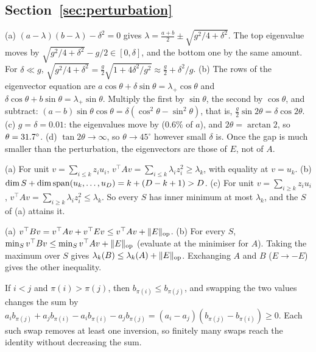 \subsection*{Section~\ref{sec:perturbation}}

(a) $(a-\lambda)(b-\lambda)-\delta^2=0$ gives $\lambda=\frac{a+b}2\pm\sqrt{g^2/4+\delta^2}$. The top eigenvalue moves
by $\sqrt{g^2/4+\delta^2}-g/2\in[0,\delta]$, and the bottom one by the same amount. For $\delta\ll g$,
$\sqrt{g^2/4+\delta^2}=\frac g2\sqrt{1+4\delta^2/g^2}\approx\frac g2+\delta^2/g$.
\newline (b) The rows of the eigenvector equation are $a\cos\theta+\delta\sin\theta=\lambda_+\cos\theta$ and
$\delta\cos\theta+b\sin\theta=\lambda_+\sin\theta$. Multiply the first by $\sin\theta$, the second by $\cos\theta$, and
subtract: $(a-b)\sin\theta\cos\theta=\delta(\cos^2\theta-\sin^2\theta)$, that is, $\frac g2\sin2\theta=\delta\cos2\theta$.
\newline (c) $g=\delta=0.01$: the eigenvalues move by \NumTwoShift{} (0.6\% of $a$), and $2\theta=\arctan2$, so
$\theta=31.7^\circ$.
\newline (d) $\tan2\theta\to\infty$, so $\theta\to45^\circ$ however small $\delta$ is. Once the gap is much smaller than the
perturbation, the eigenvectors are those of $E$, not of $A$.

(a) For unit $v=\sum_{i\le k}z_iu_i$, $v^\top Av=\sum_{i\le k}\lambda_iz_i^2\ge\lambda_k$, with equality at $v=u_k$.
\newline (b) $\dim S+\dim\operatorname{span}(u_k,\dots,u_D)=k+(D-k+1)>D$.
\newline (c) For unit $v=\sum_{i\ge k}z_iu_i$, $v^\top Av=\sum_{i\ge k}\lambda_iz_i^2\le\lambda_k$. So every $S$ has inner minimum
at most $\lambda_k$, and the $S$ of (a) attains it.

(a) $v^\top Bv=v^\top Av+v^\top Ev\le v^\top Av+\lVert E\rVert_{\mathrm{op}}$.
\newline (b) For every $S$, $\min_Sv^\top Bv\le\min_Sv^\top Av+\lVert E\rVert_{\mathrm{op}}$ (evaluate at the minimiser for $A$). Taking the
maximum over $S$ gives $\lambda_k(B)\le\lambda_k(A)+\lVert E\rVert_{\mathrm{op}}$. Exchanging $A$ and $B$ ($E\to-E$) gives the other
inequality.

If $i<j$ and $\pi(i)>\pi(j)$, then $b_{\pi(i)}\le b_{\pi(j)}$, and swapping the two values changes the sum by
$a_ib_{\pi(j)}+a_jb_{\pi(i)}-a_ib_{\pi(i)}-a_jb_{\pi(j)}=(a_i-a_j)(b_{\pi(j)}-b_{\pi(i)})\ge0$. Each such swap
removes at least one inversion, so finitely many swaps reach the identity without decreasing the sum.

